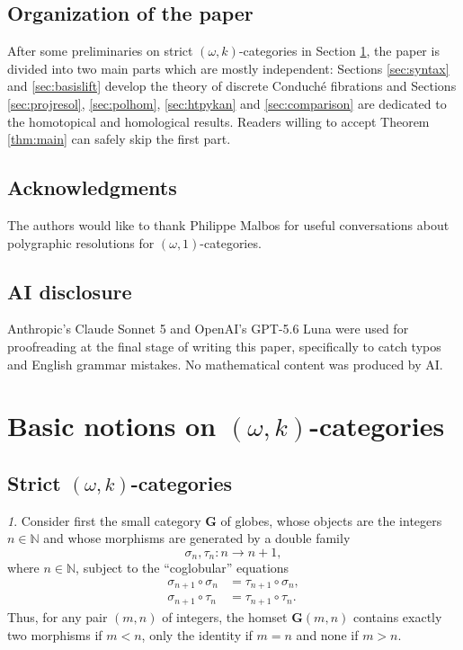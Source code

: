 \documentclass[reqno]{amsart}
\theoremstyle{plain}
\theoremstyle{definition}
\theoremstyle{remark}
\newtheorem{paragr}[subsubsection]{} %
\newcommand{\nmbr}[1]{\mathbb #1}
\newcommand{\N}{\nmbr{N}}
\newcommand{\pair}[2]{(#1,#2)}       %
\newcommand{\cosource}{\sigma} %
\newcommand{\cotarget}{\tau} %
\newcommand{\homset}[3]{#1(#2,#3)} %
\newcommand{\ctg}[1]{\mathbf{#1}}  %
\newcommand{\glob}{\ctg{G}}%
\newcommand{\cosce}[1]{\cosource_{#1}} %
\newcommand{\cotge}[1]{\cotarget_{#1}} %
\newcommand{\ook}[1]{\ensuremath{\pair{\omega}{#1}}}
\newcommand{\nbd}{\nobreakdash} %
\begin{document}
\subsection*{Organization of the paper}
After some preliminaries on strict \ook k-categories in
Section \ref{sec:basics}, the paper is divided into two main parts which are mostly
independent: Sections \ref{sec:syntax} and \ref{sec:basislift} develop the theory of discrete Conduché fibrations and Sections
\ref{sec:projresol}, \ref{sec:polhom}, \ref{sec:htpykan} and \ref{sec:comparison} are dedicated to the homotopical and homological
results. Readers willing to accept Theorem \ref{thm:main} can safely
skip the first part.
\subsection*{Acknowledgments}
The authors would like to thank Philippe Malbos for useful conversations about polygraphic resolutions for $\ook 1$\nbd-categories.
\subsection*{AI disclosure} Anthropic's Claude Sonnet 5 and OpenAI's
GPT-5.6 Luna were used for proofreading at the final stage of writing this paper, specifically to catch typos and English grammar
mistakes. No mathematical content was produced by AI.


\section{Basic notions on\texorpdfstring{ $\pair{\omega}{k}$}{(ω,k)}-categories}\label{sec:basics}
\subsection{Strict \texorpdfstring{$\pair{\omega}{k}$}{(ω,k)}-categories}\label{subsec:okcat}

\begin{paragr}
  Consider first the small category $\glob$ of globes, whose objects are
the integers $n\in\N$ and whose morphisms 
are generated by a double family
  \[
  \cosce{n},\cotge{n}: n\to n+1,
\]
where $n\in\N$,
subject to the ``coglobular'' equations
\begin{align*}
  \cosce{n+1}\circ\cosce{n} & = \cotge{n+1}\circ\cosce{n},\\
  \cosce{n+1}\circ\cotge{n} & = \cotge{n+1}\circ\cotge{n}.
\end{align*}
Thus, for any pair $\pair mn$ of integers, the homset $\homset{\glob}{m}{n}$ contains exactly two morphisms if $m<n$, only the identity if $m=n$ and none if $m>n$.

\end{paragr}
\end{document}
